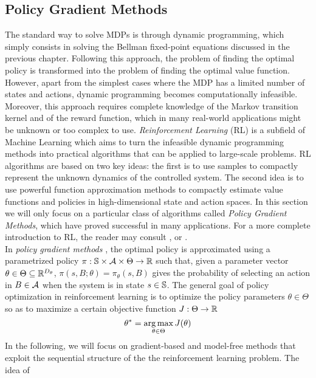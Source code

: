 \subsection{Policy Gradient Methods}
The standard way to solve MDPs is through dynamic programming, which simply consists in solving the Bellman fixed-point equations discussed in the previous chapter. Following this approach, the problem of finding the optimal policy is transformed into the problem of finding the optimal value function. However, apart from the simplest cases where the MDP has a limited number of states and actions, dynamic programming becomes computationally infeasible. Moreover, this approach requires complete knowledge of the Markov transition kernel and of the reward function, which in many real-world applications might be unknown or too complex to use. \emph{Reinforcement Learning} (RL) is a subfield of Machine Learning which aims to turn the infeasible dynamic programming methods into practical algorithms that can be applied to large-scale problems. RL algorithms are based on two key ideas: the first is to use samples to compactly represent the unknown dynamics of the controlled system. The second idea is to use powerful function approximation methods to compactly estimate value functions and policies in high-dimensional state and action spaces. In this section we will only focus on a particular class of algorithms called \emph{Policy Gradient Methods}, which have proved successful in many applications. For a more complete introduction to RL, the reader may consult \cite{sutton1998introduction}, \cite{szepesvari2010algorithms} or \cite{wiering2012reinforcement}.\\
In \emph{policy gradient methods} \cite{peters2008reinforcement}, the optimal policy is approximated using a parametrized policy $\pi: \S \times \calA \times \Theta \to \R$ such that, given a parameter vector $\theta \in \Theta \subseteq \R^{D_\theta}$, $\pi(s, B; \theta) = \pi_\theta(s, B)$ gives the probability of selecting an action in $B \in \calA$ when the system is in state $s \in \S$.
The general goal of policy optimization in reinforcement learning is to
optimize the policy parameters $\theta \in \Theta$ so as to maximize a certain
objective function $J: \Theta \to \R$
\begin{equation}
	\theta^* = \argmax_{\theta \in \Theta} J(\theta)
\end{equation}
In the following, we will focus on gradient-based and model-free methods that exploit
the sequential structure of the the reinforcement learning problem. The idea of
